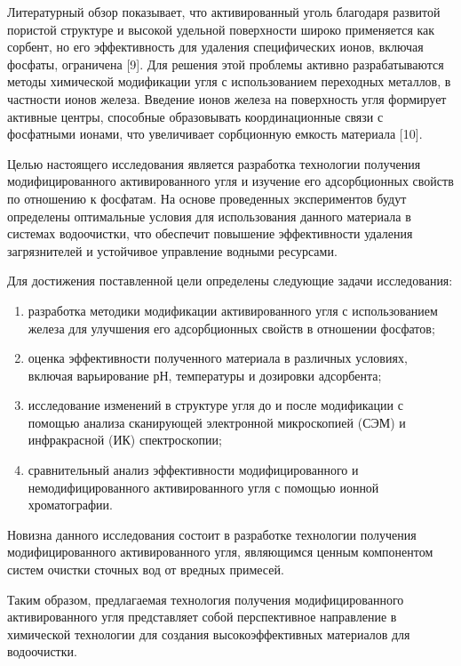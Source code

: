 Литературный обзор показывает, что активированный уголь благодаря
развитой пористой структуре и высокой удельной поверхности широко
применяется как сорбент, но его эффективность для удаления специфических
ионов, включая фосфаты, ограничена {[}9{]}. Для решения этой проблемы
активно разрабатываются методы химической модификации угля с
использованием переходных металлов, в частности ионов железа. Введение
ионов железа на поверхность угля формирует активные центры, способные
образовывать координационные связи с фосфатными ионами, что увеличивает
сорбционную емкость материала {[}10{]}.

Целью настоящего исследования является разработка технологии получения
модифицированного активированного угля и изучение его адсорбционных
свойств по отношению к фосфатам. На основе проведенных экспериментов
будут определены оптимальные условия для использования данного материала
в системах водоочистки, что обеспечит повышение эффективности удаления
загрязнителей и устойчивое управление водными ресурсами.

Для достижения поставленной цели определены следующие задачи
исследования:

\begin{enumerate}
\def\labelenumi{\arabic{enumi}.}
\item
  разработка методики модификации активированного угля с использованием
  железа для улучшения его адсорбционных свойств в отношении фосфатов;
\item
  оценка эффективности полученного материала в различных условиях,
  включая варьирование рН, температуры и дозировки адсорбента;
\item
  исследование изменений в структуре угля до и после модификации с
  помощью анализа сканирующей электронной микроскопией (СЭМ) и
  инфракрасной (ИК) спектроскопии;
\item
  сравнительный анализ эффективности модифицированного и
  немодифицированного активированного угля с помощью ионной
  хроматографии.
\end{enumerate}

Новизна данного исследования состоит в разработке технологии получения
модифицированного активированного угля, являющимся ценным компонентом
систем очистки сточных вод от вредных примесей.

Таким образом, предлагаемая технология получения модифицированного
активированного угля представляет собой перспективное направление в
химической технологии для создания высокоэффективных материалов для
водоочистки.

